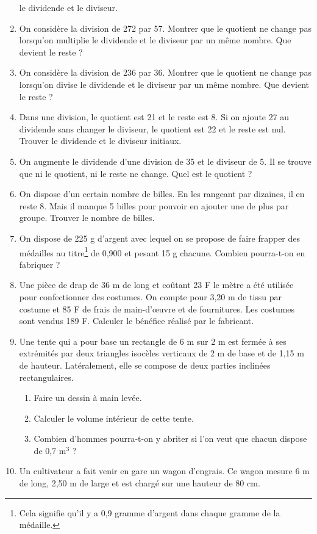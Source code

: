 \documentclass[12 pt]{report}
\theoremstyle{plain}
\newcounter{n}
\begin{document}
\begin{enumerate}
 le dividende et le diviseur.
 \item On considère la division de 272 par 57. Montrer que le quotient ne change pas lorsqu'on multiplie le dividende et le diviseur par un même nombre. Que devient le reste ? 
 \item On considère la division de 236 par 36. Montrer que le quotient ne change pas lorsqu'on divise le dividende et le diviseur par un même nombre. Que devient le reste ? 
 \item Dans une division, le quotient est 21 et le
 reste est 8. Si on ajoute 27 au dividende
 sans changer le diviseur, le quotient est 22 et le
 reste est nul. Trouver le dividende et le diviseur 
 initiaux. 
 \item On augmente le dividende d'une division de 
 35 et le diviseur de 5. Il se trouve que ni le 
 quotient, ni le reste ne change. Quel est le quotient
 ?
 \item On dispose d'un certain nombre de billes. 
 En les rangeant par dizaines, il en reste 8. Mais il manque 5 billes pour pouvoir en ajouter une de plus par groupe. Trouver le nombre de billes. 
 \item On dispose de 225 g d'argent avec lequel on se propose de faire frapper des médailles au titre\footnote{Cela signifie qu'il y a 0,9 gramme d'argent dans chaque gramme de la médaille.} de 
 0,900 et pesant 15 g chacune. Combien pourra-t-on 
 en fabriquer ? 
 \item Une pièce de drap de 36 m de long et coûtant 
 23 F le mètre a été utilisée pour confectionner
 des costumes. On compte pour 3,20 m de tissu par 
 costume et 85 F de frais de main-d'œuvre et de fournitures. Les costumes sont vendus 189 F. Calculer 
 le bénéfice réalisé par le fabricant. 
 \item Une tente qui a pour base un rectangle de 6 m sur 2 m est fermée à ses extrémités par deux triangles isocèles verticaux de 2 m de base et de 1,15 m de 
 hauteur. Latéralement, elle se compose de deux parties inclinées rectangulaires. 
 \begin{enumerate}
 \item Faire un dessin à main levée.
 \item Calculer le volume intérieur de cette tente.  \item Combien d'hommes pourra-t-on
 y abriter si l'on veut que chacun dispose de 0,7 m${}^3$ ?
 \end{enumerate}
 \item Un cultivateur a fait venir en gare un wagon 
 d'engrais. Ce wagon mesure 6 m de long, 2,50 m de large et est chargé sur une hauteur de 80 cm. 

\end{enumerate}
\end{document}
